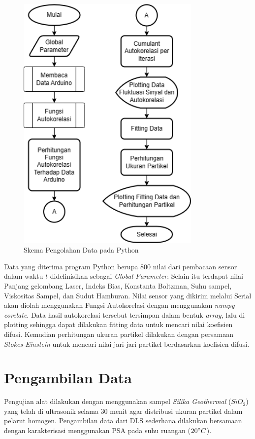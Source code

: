 \begin{figure}[H]
    \centering
    \includegraphics[width=9cm]{Images/Skema Python.png}
    \caption{Skema Pengolahan Data pada Python}
    \label{fig:schemapy}
\end{figure}

Data yang diterima program Python berupa 800 nilai dari pembacaan sensor dalam waktu ${t}$
didefinisikan sebagai \textit{Global Parameter}. Selain itu terdapat nilai Panjang gelombang
Laser, Indeks Bias, Konstanta Boltzman, Suhu sampel, Viskositas Sampel, dan Sudut Hamburan.
Nilai sensor yang dikirim melalui Serial akan diolah menggunakan Fungsi Autokorelasi dengan
menggunakan \textit{numpy corelate}. Data hasil autokorelasi tersebut tersimpan dalam bentuk
\textit{array}, lalu di plotting sehingga dapat dilakukan fitting data untuk mencari nilai
koefisien difusi. Kemudian perhitungan ukuran partikel dilakukan dengan persamaan 
\textit{Stokes-Einstein} untuk mencari nilai jari-jari partikel berdasarkan koefisien difusi.


\section{Pengambilan Data}
Pengujian alat dilakukan dengan menggunakan sampel \textit{Silika Geothermal} (${SiO_2}$) yang
telah di ultrasonik selama 30 menit agar distribusi ukuran partikel dalam pelarut homogen.
Pengambilan data dari DLS sederhana dilakukan bersamaan dengan karakterisasi menggunakan PSA
pada suhu ruangan (${20\degree C}$).

